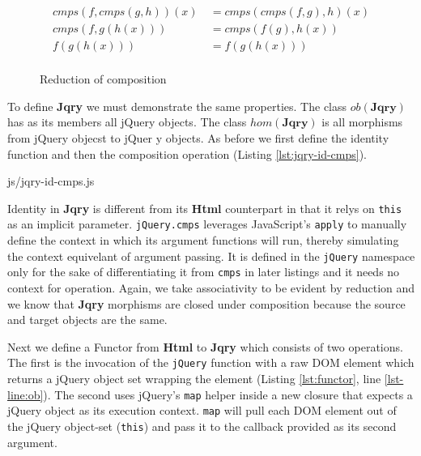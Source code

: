 \documentclass[preprint, leqno]{sigplanconf}
\begin{document}
\begin{figure}
\begin{displaymath}
\begin{aligned}
cmps(f,cmps(g,h))(x)\ &= cmps(cmps(f,g),h)(x) \\
cmps(f,g(h(x)))\ &= cmps(f(g),h(x)) \\
f(g(h(x)))\ &= f(g(h(x)))\\
\end{aligned}
\end{displaymath}
\nocaptionrule \caption{Reduction of composition}
\label{fig:html-associativity}
\end{figure}

To define \textbf{Jqry} we must demonstrate the same properties. The class \begin{math}ob(\mathbf{Jqry})\end{math} has as its members all jQuery objects. The class \begin{math}hom(\mathbf{Jqry})\end{math} is all morphisms from jQuery objecst to jQuer y objects. As before we first define the identity function and then the composition operation (Listing \ref{lst:jqry-id-cmps}).

\begin{lstinputlisting}[
    language=JavaScript,
    caption={Identity and Composition in Jqry},
    label={lst:jqry-id-cmps},
    escapeinside={@}{@}
]{js/jqry-id-cmps.js}
\end{lstinputlisting}

Identity in \textbf{Jqry} is different from its \textbf{Html} counterpart in that it relys on \verb|this| as an implicit parameter. \verb|jQuery.cmps| leverages JavaScript's \verb|apply| to manually define the context in which its argument functions will run, thereby simulating the context equivelant of argument passing. It is defined in the \verb|jQuery| namespace only for the sake of differentiating it from \verb|cmps| in later listings and it needs no context for operation. Again, we take associativity to be evident by reduction and we know that \textbf{Jqry} morphisms are closed under composition because the source and target objects are the same.

Next we define a Functor from \textbf{Html} to \textbf{Jqry} which consists of two operations. The first is the invocation of the \verb|jQuery| function with a raw DOM element which returns a jQuery object set wrapping the element (Listing \ref{lst:functor}, line \ref{lst-line:ob}). The second uses jQuery's \verb|map| helper inside a new closure that expects a jQuery object as its execution context. \verb|map| will pull each DOM element out of the jQuery object-set (\verb|this|) and pass it to the callback provided as its second argument.
\end{document}
